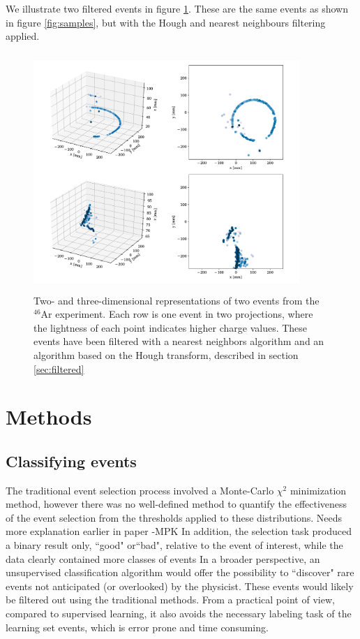 \documentclass[review,number,sort&compress]{elsarticle}
\begin{document}
We illustrate two filtered events in figure \ref{fig:samples_filtered}. These are the same events as shown in figure \ref{fig:samples}, but with the Hough and nearest neighbours filtering applied. 

\begin{figure}[ht]
\centering
\includegraphics[width=0.9\textwidth, height=9cm]{custom_work/examples_filtered.pdf}
\caption[Displaying filtered events in 2D and 3D]{Two- and three-dimensional representations of two events from the ${}^{46}$Ar experiment. Each row is one event in two projections, where the lightness of each point indicates higher charge values. These events have been filtered with a nearest neighbors algorithm and an algorithm based on the Hough transform, described in section \ref{sec:filtered}}\label{fig:samples_filtered}
\end{figure}


\section{Methods}\label{sec:methods}

\subsection{Classifying  events} 
The traditional event selection process involved a Monte-Carlo $\chi^2$ minimization method, however there was no well-defined method to quantify the effectiveness of the event selection from the thresholds applied to these distributions.
{\color{blue} Needs more explanation earlier in paper -MPK}
In addition, the selection task produced a binary result only, ``good" or``bad", relative to the event of interest, while the data clearly contained more classes of events%
In a broader perspective, an unsupervised classification algorithm would offer the possibility to ``discover" rare events not anticipated (or overlooked) by the physicist. These events would likely be filtered out using the traditional methods. From a practical point of view, compared to supervised learning, it also avoids the necessary labeling task of the learning set events, which is error prone and time consuming.
\end{document}
